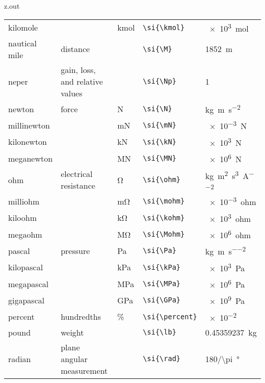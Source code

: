 \begin{VerbatimOut}{z.out}
{\begin{longtable}{@{}P{1.4in}P{1in}llP{1.8in}@{}}
    \quad kilomole&
      \ditto&
      \si{\kmol}&
      \verb+\si{\kmol}+&
      \SI{e3}{\mol}\\
    \vsp
    nautical mile&
      distance&
      \si{\M}&
      \verb+\si{\M}+&
      \SI{1852}{\m}\\
    \vsp
    neper&
      gain, loss, and relative values&
      \si{\Np}&
      \verb+\si{\Np}+&
      1\\
    \vsp
    newton&
      force&
      \si{\N}&
      \verb+\si{\N}+&
      \si{\kg\m\per\s\squared}\\
    \quad millinewton&
      \ditto&
      \si{\mN}&
      \verb+\si{\mN}+&
      \SI{e-3}{\N}\\
    \quad kilonewton&
      \ditto&
      \si{\kN}&
      \verb+\si{\kN}+&
      \SI{e3}{\N}\\
    \quad meganewton&
      \ditto&
      \si{\MN}&
      \verb+\si{\MN}+&
      \SI{e6}{\N}\\
    \vsp
    ohm&
      electrical resistance&
      \si{\ohm}&
      \verb+\si{\ohm}+&
      \si{\kg\m\squared\per\s\cubed\per\A\squared}\\
    \quad milliohm&
      \ditto&
      \si{\mohm}&
      \verb+\si{\mohm}+&
      \SI{e-3}{ohm}\\
    \quad kiloohm&
      \ditto&
      \si{\kohm}&
      \verb+\si{\kohm}+&
      \SI{e3}{ohm}\\
    \quad megaohm&
      \ditto&
      \si{\Mohm}&
      \verb+\si{\Mohm}+&
      \SI{e6}{ohm}\\
    \vsp
    pascal&
      pressure&
      \si{\Pa}&
      \verb+\si{\Pa}+&
      \si{\kg\per\m\per\s\squared}\\
    \qquad kilopascal&
      \ditto&
      \si{\kPa}&
      \verb+\si{\kPa}+&
      \SI{e3}{\Pa}\\
    \qquad megapascal&
      \ditto&
      \si{\MPa}&
      \verb+\si{\MPa}+&
      \SI{e6}{\Pa}\\
    \qquad gigapascal&
      \ditto&
      \si{\GPa}&
      \verb+\si{\GPa}+&
      \SI{e9}{\Pa}\\
    \vsp
    percent&
      hundredths&
      \si{\percent}&
      \verb+\si{\percent}+&
      \SI{e-2}{}\\
    \vsp
    pound&
      weight&
      \si{\lb}&
      \verb+\si{\lb}+&
      \SI{.45359237}{\kg}\\  %
    \vsp
    radian&
      plane angular measurement&
      \si{\rad}&
      \verb+\si{\rad}+&
      \SI{180/\pi}{\degree}\\

\end{longtable}}
\end{VerbatimOut}
